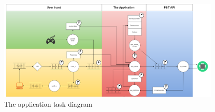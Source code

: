 \begin{figure}
	\centering
	\includegraphics[scale= 0.4, angle = 90] {Billeder/microcontroller-Task-Diagram}
	\caption{The application task diagram}
	\label{fig:applicaiton_task_diagram}
\end{figure}




